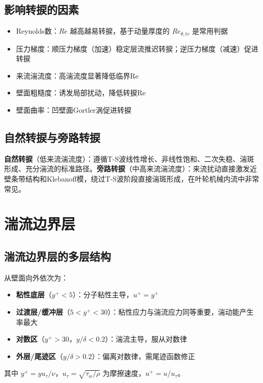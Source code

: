 \subsection{影响转捩的因素}

\begin{itemize}
    \item Reynolds数：$Re$ 越高越易转捩，基于动量厚度的 $Re_{\theta,tr}$ 是常用判据
    \item 压力梯度：顺压力梯度（加速）稳定层流推迟转捩；逆压力梯度（减速）促进转捩
    \item 来流湍流度：高湍流度显著降低临界Re
    \item 壁面粗糙度：诱发局部扰动，降低转捩Re
    \item 壁面曲率：凹壁面Gortler涡促进转捩
\end{itemize}

\subsection{自然转捩与旁路转捩}

\textbf{自然转捩}（低来流湍流度）：遵循T-S波线性增长、非线性饱和、二次失稳、湍斑形成、充分湍流的标准路径。\textbf{旁路转捩}（中高来流湍流度）：来流扰动直接激发近壁条带结构和Klebanoff模，绕过T-S波阶段直接湍斑形成，在叶轮机械内流中非常常见。

\section{湍流边界层}

\subsection{湍流边界层的多层结构}

从壁面向外依次为：

\begin{itemize}
    \item \textbf{粘性底层}（$y^{+} < 5$）：分子粘性主导，$u^{+} = y^{+}$
    \item \textbf{过渡层/缓冲层}（$5 < y^{+} < 30$）：粘性应力与湍流应力同等重要，湍动能产生率最大
    \item \textbf{对数区}（$y^{+} > 30$，$y/\delta < 0.2$）：湍流主导，服从对数律
    \item \textbf{外层/尾迹区}（$y/\delta > 0.2$）：偏离对数律，需尾迹函数修正
\end{itemize}

其中 $y^{+} = y u_{\tau}/\nu$，$u_{\tau} = \sqrt{\tau_w/\rho}$ 为摩擦速度，$u^{+} = u/u_{\tau}$。


